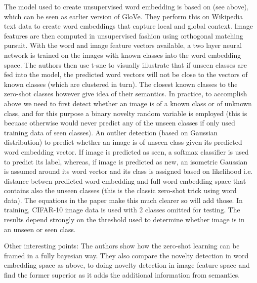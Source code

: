 \documentclass{report}
\begin{document}
The model used to create unsupervised word embedding is based on \cite{HuangWordemb} (see above), which can be seen as earlier version of GloVe. They perform this on Wikipedia text data to create word embeddings that capture local and global context. Image features are then computed in unsupervised fashion using orthogonal matching pursuit. With the word and image feature vectors available, a two layer neural network is trained on the images with known classes into the word embedding space. The authors then use t-sne to visually illustrate that if unseen classes are fed into the model, the predicted word vectors will not be close to the vectors of known classes (which are clustered in turn). The closest known classes to the zero-shot classes however give idea of their semantics. In practice, to accomplish above we need to first detect whether an image is of a known class or of unknown class, and for this purpose a binary novelty random variable is employed (this is becuase otherwise would never predict any of the unseen classes if only used training data of seen classes). An outlier detection (based on Gaussian distribution) to predict whether an image is of unseen class given its predicted word embedding vector. If image is predicted as seen, a softmax classifier is used to predict its label, whereas, if image is predicted as new, an isometric Gaussian is assumed around its word vector and its class is assigned based on likelihood i.e. distance betwen predicted word embedding and full-word embedding space that contains also the unseen classes (this is the classic zero-shot trick using word data). The equations in the paper make this much clearer so will add those. In training, CIFAR-10 image data is used with 2 classes omitted for testing. The results depend strongly on the threshold used to determine whether image is in an unseen or seen class.

Other interesting points: The authors show how the zero-shot learning can be framed in a fully bayesian way. They also compare the novelty detection in word embedding space as above, to doing novelty detection in image feature space and find the former superior as it adds the additional information from semantics.
\end{document}
